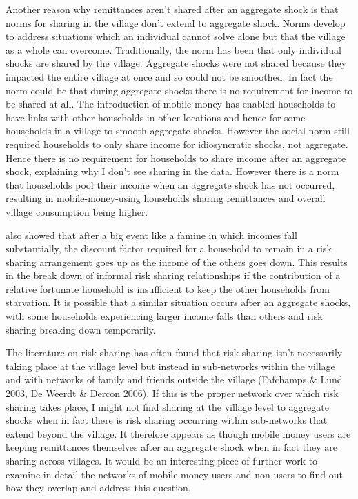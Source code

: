 Another reason why remittances aren't shared after an aggregate shock is that norms for sharing in the village don't extend to aggregate shock. Norms develop to address situations which an individual cannot solve alone but that the village as a whole can overcome. Traditionally, the norm has been that only individual shocks are shared by the village. Aggregate shocks were not shared because they impacted the entire village at once and so could not be smoothed. In fact the norm could be that during aggregate shocks there is no requirement for income to be shared at all. The introduction of mobile money has enabled households to have links with other households in other locations and hence for some households in a village to smooth aggregate shocks. However the social norm still required households to only share income for idiosyncratic shocks, not aggregate. Hence there is no requirement for households to share income after an aggregate shock, explaining why I don't see sharing in the data. However there is a norm that households pool their income when an aggregate shock has not occurred, resulting in mobile-money-using households sharing remittances and overall village consumption being higher.

\cite{coate1993} also showed that after a big event like a famine in which incomes fall substantially, the discount factor required for a household to remain in a risk sharing arrangement goes up as the income of the others goes down. This results in the break down of informal risk sharing relationships if the contribution of a relative fortunate household is insufficient to keep the other households from starvation. It is possible that a similar situation occurs after an aggregate shocks, with some households experiencing larger income falls than others and risk sharing breaking down temporarily.  

The literature on risk sharing has often found that risk sharing isn't necessarily taking place at the village level but instead in sub-networks within the village and with networks of family and friends outside the village (Fafchamps \& Lund 2003, De Weerdt \& Dercon 2006). If this is the proper network over which risk sharing takes place, I might not find sharing at the village level to aggregate shocks when in fact there is risk sharing occurring within sub-networks that extend beyond the village. It therefore appears as though mobile money users are keeping remittances themselves after an aggregate shock when in fact they are sharing across villages. It would be an interesting piece of further work to examine in detail the networks of mobile money users and non users to find out how they overlap and address this question. 


